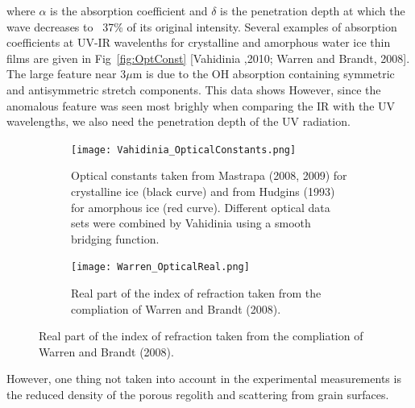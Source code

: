 \documentclass[11pt]{article} %
\begin{document}
	where $\alpha$ is the absorption coefficient and $\delta$ is the penetration depth at which the wave decreases to ~37\% of its original intensity. Several examples of absorption coefficients at UV-IR wavelenths for crystalline and amorphous water ice thin films are given in Fig~\ref{fig:OptConst} [Vahidinia ,2010; Warren and Brandt, 2008]. The large feature near 3$\mu$m is due to the OH absorption containing symmetric and antisymmetric stretch components. This data shows  However, since the anomalous feature was seen most brighly when comparing the IR with the UV wavelengths, we also need the penetration depth of the UV radiation.  

	\begin{figure}[hb] \label{fig:OptConst}
	\centering
		\begin{subfigure}[h]{\textwidth}
			\texttt{[image: Vahidinia\_OpticalConstants.png]}
			\caption{Optical constants taken from Mastrapa (2008, 2009) for crystalline ice (black curve) and from Hudgins (1993) for amorphous ice (red curve). Different optical data sets were combined by Vahidinia using a smooth bridging function.}
		\end{subfigure}
		\begin{subfigure}[h]{\textwidth}
			\texttt{[image: Warren\_OpticalReal.png]}
			\caption{Real part of the index of refraction taken from the compliation of Warren and Brandt (2008).}
		\end{subfigure}
	\end{figure}

	However, one thing not taken into account in the experimental measurements is the reduced density of the porous regolith and scattering from grain surfaces. 
	
\end{document}
